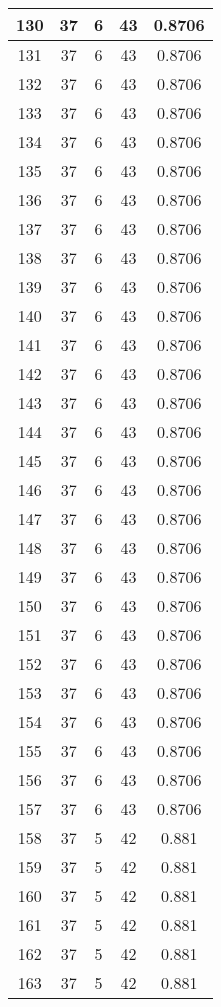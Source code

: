 \documentclass[letterpaper, 12pt]{article}
\begin{document}
\begin{longtable}{|c|c|c|c|c|}
\hline
130 & 37 & 6 & 43 & 0.8706 \\
\hline
131 & 37 & 6 & 43 & 0.8706 \\
\hline
132 & 37 & 6 & 43 & 0.8706 \\
\hline
133 & 37 & 6 & 43 & 0.8706 \\
\hline
134 & 37 & 6 & 43 & 0.8706 \\
\hline
135 & 37 & 6 & 43 & 0.8706 \\
\hline
136 & 37 & 6 & 43 & 0.8706 \\
\hline
137 & 37 & 6 & 43 & 0.8706 \\
\hline
138 & 37 & 6 & 43 & 0.8706 \\
\hline
139 & 37 & 6 & 43 & 0.8706 \\
\hline
140 & 37 & 6 & 43 & 0.8706 \\
\hline
141 & 37 & 6 & 43 & 0.8706 \\
\hline
142 & 37 & 6 & 43 & 0.8706 \\
\hline
143 & 37 & 6 & 43 & 0.8706 \\
\hline
144 & 37 & 6 & 43 & 0.8706 \\
\hline
145 & 37 & 6 & 43 & 0.8706 \\
\hline
146 & 37 & 6 & 43 & 0.8706 \\
\hline
147 & 37 & 6 & 43 & 0.8706 \\
\hline
148 & 37 & 6 & 43 & 0.8706 \\
\hline
149 & 37 & 6 & 43 & 0.8706 \\
\hline
150 & 37 & 6 & 43 & 0.8706 \\
\hline
151 & 37 & 6 & 43 & 0.8706 \\
\hline
152 & 37 & 6 & 43 & 0.8706 \\
\hline
153 & 37 & 6 & 43 & 0.8706 \\
\hline
154 & 37 & 6 & 43 & 0.8706 \\
\hline
155 & 37 & 6 & 43 & 0.8706 \\
\hline
156 & 37 & 6 & 43 & 0.8706 \\
\hline
157 & 37 & 6 & 43 & 0.8706 \\
\hline
158 & 37 & 5 & 42 & 0.881 \\
\hline
159 & 37 & 5 & 42 & 0.881 \\
\hline
160 & 37 & 5 & 42 & 0.881 \\
\hline
161 & 37 & 5 & 42 & 0.881 \\
\hline
162 & 37 & 5 & 42 & 0.881 \\
\hline
163 & 37 & 5 & 42 & 0.881 \\

\end{longtable}
\end{document}
